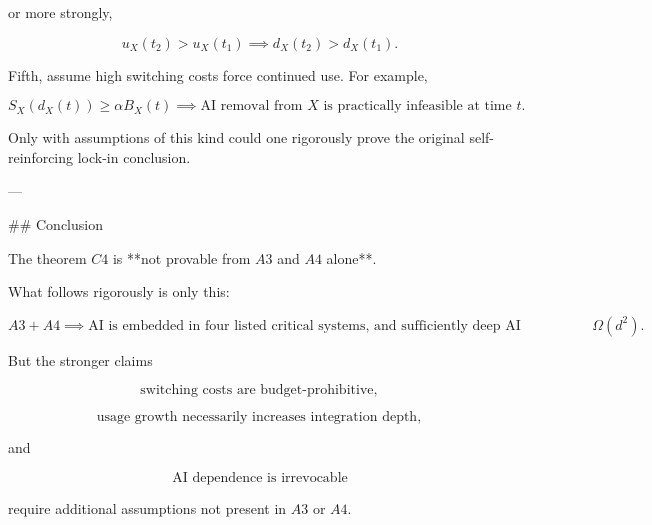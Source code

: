 or more strongly,

\[
u_X(t_2)>u_X(t_1)
\implies
d_X(t_2)>d_X(t_1).
\]

Fifth, assume high switching costs force continued use. For example,

\[
S_X(d_X(t)) \ge \alpha B_X(t)
\implies
\text{AI removal from } X \text{ is practically infeasible at time } t.
\]

Only with assumptions of this kind could one rigorously prove the original self-reinforcing lock-in conclusion.

---

## Conclusion

The theorem \(C4\) is **not provable from \(A3\) and \(A4\) alone**.

What follows rigorously is only this:

\[
A3 + A4
\implies
\text{AI is embedded in four listed critical systems, and sufficiently deep AI integrations have switching costs } \Omega(d^2).
\]

But the stronger claims

\[
\text{switching costs are budget-prohibitive},
\]

\[
\text{usage growth necessarily increases integration depth},
\]

and

\[
\text{AI dependence is irrevocable}
\]

require additional assumptions not present in \(A3\) or \(A4\).
